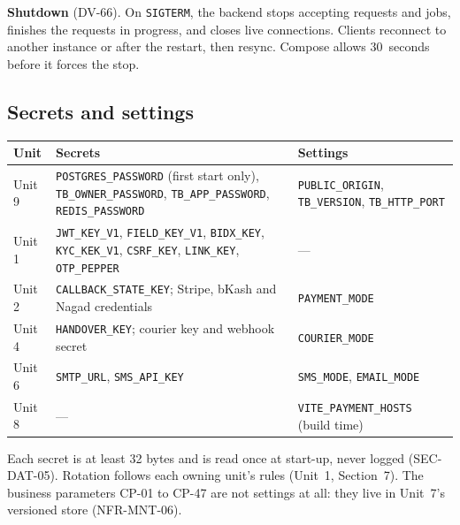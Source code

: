 \documentclass[11pt,a4paper]{article}
\newenvironment{dtable}[1]{\small\begin{longtable}{#1}}{\end{longtable}}
\begin{document}
\textbf{Shutdown} (DV-66). On \texttt{SIGTERM}, the backend stops accepting requests and jobs, finishes the requests in progress, and closes live connections. Clients reconnect to another instance or after the restart, then resync. Compose allows 30~seconds before it forces the stop.

\subsection{Secrets and settings}
\begin{dtable}{@{}>{\raggedright\arraybackslash}p{2.0cm}>{\raggedright\arraybackslash}p{6.4cm}>{\raggedright\arraybackslash}p{6.8cm}@{}}
\toprule
\textbf{Unit} & \textbf{Secrets} & \textbf{Settings} \\ \midrule \endhead
Unit 9 & \texttt{POSTGRES\_\allowbreak PASSWORD} (first start only), \texttt{TB\_\allowbreak OWNER\_\allowbreak PASSWORD}, \texttt{TB\_\allowbreak APP\_\allowbreak PASSWORD}, \texttt{REDIS\_\allowbreak PASSWORD} & \texttt{PUBLIC\_\allowbreak ORIGIN}, \texttt{TB\_VERSION}, \texttt{TB\_\allowbreak HTTP\_\allowbreak PORT} \\
Unit 1 & \texttt{JWT\_KEY\_V1}, \texttt{FIELD\_\allowbreak KEY\_\allowbreak V1}, \texttt{BIDX\_KEY}, \texttt{KYC\_KEK\_V1}, \texttt{CSRF\_KEY}, \texttt{LINK\_KEY}, \texttt{OTP\_PEPPER} & --- \\
Unit 2 & \texttt{CALLBACK\_\allowbreak STATE\_\allowbreak KEY}; Stripe, bKash and Nagad credentials & \texttt{PAYMENT\_MODE} \\
Unit 4 & \texttt{HANDOVER\_KEY}; courier key and webhook secret & \texttt{COURIER\_MODE} \\
Unit 6 & \texttt{SMTP\_URL}, \texttt{SMS\_API\_KEY} & \texttt{SMS\_MODE}, \texttt{EMAIL\_MODE} \\
Unit 8 & --- & \texttt{VITE\_\allowbreak PAYMENT\_\allowbreak HOSTS} (build time) \\
\bottomrule
\end{dtable}
Each secret is at least 32 bytes and is read once at start-up, never logged (SEC-DAT-05). Rotation follows each owning unit's rules (Unit~1, Section~7). The business parameters CP-01 to CP-47 are not settings at all: they live in Unit~7's versioned store (NFR-MNT-06).
\end{document}
